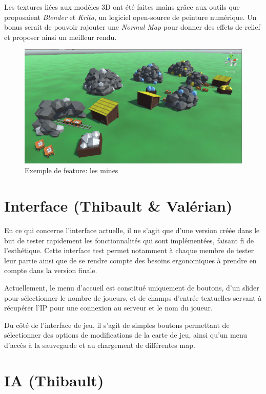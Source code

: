 \documentclass[12pt]{report}
\begin{document}
Les textures liées aux modèles 3D ont été faites mains grâce aux outils que proposaient \textit{Blender} et \textit{Krita}, un logiciel open-source de peinture numérique. Un bonus serait de pouvoir rajouter une \textit{Normal Map} pour donner des effets de relief et proposer ainsi un meilleur rendu.

\begin{figure}[H]
    \centering
    \includegraphics[scale=0.8]{mines}
    \caption{Exemple de feature: les mines}
\end{figure}

\section{Interface (Thibault \& Valérian)}

En ce qui concerne l’interface actuelle, il ne s’agit que d’une version créée dans le but de tester rapidement les fonctionnalités qui sont implémentées, faisant fi de l’esthétique. Cette interface test permet notamment à chaque membre de tester leur partie ainsi que de se rendre compte des besoins ergonomiques à prendre en compte dans la version finale.

Actuellement, le menu d’accueil est constitué uniquement de boutons, d’un slider pour sélectionner le nombre de joueurs, et de champs d’entrée textuelles servant à récupérer l’IP pour une connexion au serveur et le nom du joueur.

Du côté de l’interface de jeu, il s’agit de simples boutons permettant de sélectionner des options de modifications de la carte de jeu, ainsi qu’un menu d'accès à la sauvegarde et au chargement de différentes map.

\section{IA (Thibault)}
\end{document}
